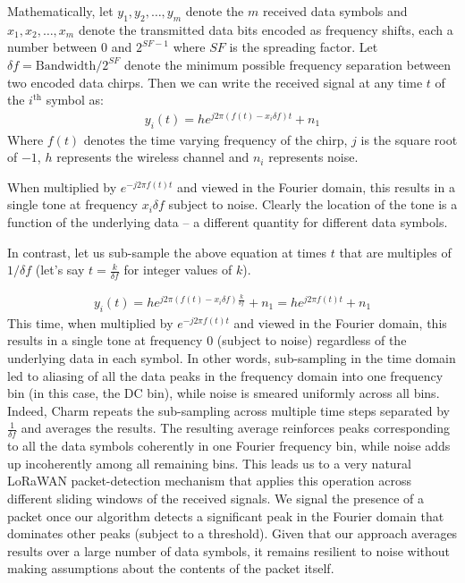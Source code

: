 Mathematically, let $y_1, y_2, \dots, y_m$ denote the $m$ received data
symbols and $x_1, x_2, \dots, x_m$ denote the transmitted data bits encoded as
frequency shifts, each a number between $0$ and $2^{SF-1}$ where $SF$ is the
spreading factor. Let $\delta f = \text{Bandwidth} / 2^{SF}$ denote the
minimum possible frequency separation between two encoded data chirps.  Then
we can write the received signal at any time $t$ of the $i^{\text{th}}$ symbol
as:
\begin{align}
    y_i(t) = h e^{j 2 \pi (f(t) - x_i \delta f) t} + n_1 \label{eqn:yi}
\end{align}
Where $f(t)$ denotes the time varying frequency of the chirp, $j$ is the
square root of $-1$, $h$ represents the wireless channel and $n_i$ represents
noise.

When multiplied by $e^{-j 2 \pi f(t) t}$ and viewed in the Fourier domain,
this results in a single tone at frequency $x_i \delta f$ subject to noise.
Clearly the location of the tone is a function of the underlying data -- a
different quantity for different data symbols.

In contrast, let us sub-sample the above equation at times $t$ that are
multiples of $1/\delta f$ (let's say $t = \frac{k}{\delta f}$ for integer
values of $k$).

\begin{align}
    y_i\left(t\right) = h e^{j 2 \pi (f(t) - x_i \delta f) \frac{k}{\delta f}} + n_1 = h e^{j 2 \pi f(t) t} + n_1\label{eqn:yi2}
\end{align}
This time, when multiplied by $e^{-j 2 \pi f(t) t}$ and viewed in the Fourier
domain, this results in a single tone at frequency $0$ (subject to noise)
regardless of the underlying data in each symbol. In other words, sub-sampling
in the time domain led to aliasing of all the data peaks in the frequency
domain into one frequency bin (in this case, the DC bin), while noise is
smeared uniformly across all bins. Indeed, Charm repeats the sub-sampling
across multiple time steps separated  by $\frac{1}{\delta f}$ and averages the
results. The resulting average reinforces peaks corresponding to all the data
symbols coherently in one Fourier frequency bin, while noise adds up
incoherently among all remaining bins. This leads us to a very natural LoRaWAN
packet-detection mechanism that applies this operation across different
sliding windows of the received signals. We signal the presence of a packet
once our algorithm detects a significant peak in the Fourier domain that
dominates other peaks (subject to a threshold). Given that our approach
averages results over a large number of data symbols, it remains resilient to
noise without making assumptions about the contents of the packet itself.

